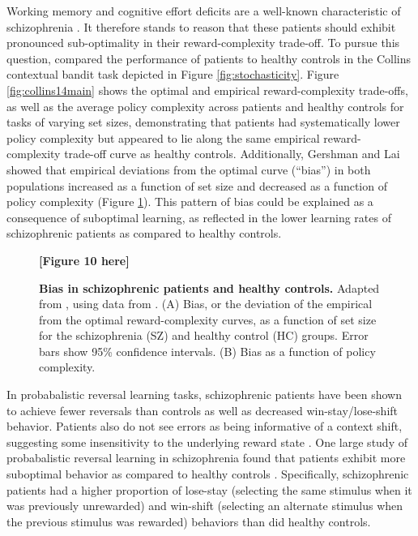 \documentclass[11pt]{article}
\begin{document}
Working memory and cognitive effort deficits are a well-known characteristic of schizophrenia \citep{culbreth18,forbes09}. It therefore stands to reason that these patients should exhibit pronounced sub-optimality in their reward-complexity trade-off. To pursue this question, \cite{gershmanlai20} compared the performance of patients to healthy controls in the Collins contextual bandit task depicted in Figure \ref{fig:stochasticity}. Figure \ref{fig:collins14main} shows the optimal and empirical reward-complexity trade-offs, as well as the average policy complexity across patients and healthy controls for tasks of varying set sizes, demonstrating that patients had systematically lower policy complexity but appeared to lie along the same empirical reward-complexity trade-off curve as healthy controls. Additionally, Gershman and Lai showed that empirical deviations from the optimal curve (``bias'') in both populations increased as a function of set size and decreased as a function of policy complexity (Figure \ref{fig:collins14bias}). This pattern of bias could be explained as a consequence of suboptimal learning, as reflected in the lower learning rates of schizophrenic patients as compared to healthy controls. 

\begin{figure}
    \centering
    \textbf{[Figure 10 here]}
            \caption{\textbf{Bias in schizophrenic patients and healthy controls.} Adapted from \cite{gershmanlai20}, using data from \citet{collins14}. (A) Bias, or the deviation of the empirical from the optimal reward-complexity curves, as a function of set size for the schizophrenia (SZ) and healthy control (HC) groups. Error bars show 95\% confidence intervals. (B) Bias as a function of policy complexity.}
    \label{fig:collins14bias}
\end{figure}

In probabalistic reversal learning tasks, schizophrenic patients have been shown to achieve fewer reversals than controls as well as decreased win-stay/lose-shift behavior. Patients also do not see errors as being informative of a context shift, suggesting some insensitivity to the underlying reward state \citep{Culbreth2016-rs,Schlagenhauf2014-oz}. One large study of probabalistic reversal learning in schizophrenia found that patients exhibit more suboptimal behavior as compared to healthy controls \citep{Reddy2016-ew}. Specifically, schizophrenic patients had a higher proportion of lose-stay (selecting the same stimulus when it was previously unrewarded) and win-shift (selecting an alternate stimulus when the previous stimulus was rewarded) behaviors than did healthy controls. 
\end{document}
